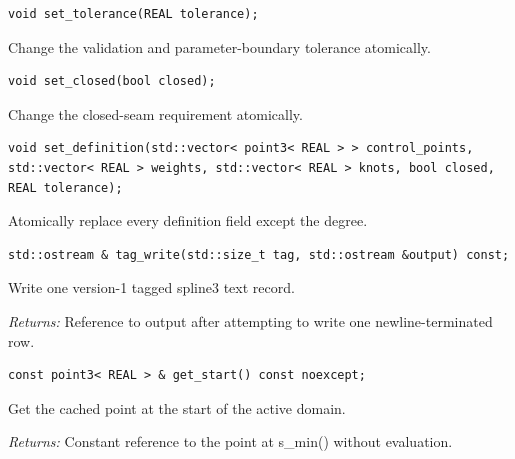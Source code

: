 \par\noindent\begin{minipage}{\linewidth}
\begin{lstlisting}[style=apireference]
void set_tolerance(REAL tolerance);
\end{lstlisting}
{\footnotesize Change the validation and parameter-boundary tolerance atomically.\par}
\end{minipage}\par\vspace{1pt}
\par\noindent\begin{minipage}{\linewidth}
\begin{lstlisting}[style=apireference]
void set_closed(bool closed);
\end{lstlisting}
{\footnotesize Change the closed-seam requirement atomically.\par}
\end{minipage}\par\vspace{1pt}
\par\noindent\begin{minipage}{\linewidth}
\begin{lstlisting}[style=apireference]
void set_definition(std::vector< point3< REAL > > control_points, std::vector< REAL > weights, std::vector< REAL > knots, bool closed, REAL tolerance);
\end{lstlisting}
{\footnotesize Atomically replace every definition field except the degree.\par}
\end{minipage}\par\vspace{1pt}
\par\noindent\begin{minipage}{\linewidth}
\begin{lstlisting}[style=apireference]
std::ostream & tag_write(std::size_t tag, std::ostream &output) const;
\end{lstlisting}
{\footnotesize Write one version-1 tagged spline3 text record.\par}
{\footnotesize\textit{Returns:} Reference to output after attempting to write one newline-terminated row.\par}
\end{minipage}\par\vspace{1pt}
\par\noindent\begin{minipage}{\linewidth}
\begin{lstlisting}[style=apireference]
const point3< REAL > & get_start() const noexcept;
\end{lstlisting}
{\footnotesize Get the cached point at the start of the active domain.\par}
{\footnotesize\textit{Returns:} Constant reference to the point at s\_min() without evaluation.\par}
\end{minipage}\par\vspace{1pt}
